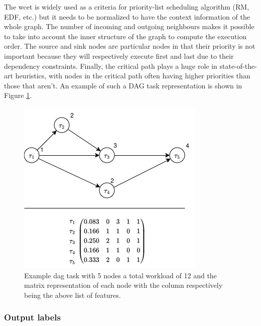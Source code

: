 The wcet is widely used as a criteria for priority-list scheduling algorithm (RM, EDF\cite{buttazzo2005RMvsEDF}, etc.)
but it needs to be normalized to have the context information of the whole graph.
The number of incoming and outgoing neighbours makes it possible 
to take into account the inner structure of the graph to compute the execution order.
The source and sink nodes are particular nodes in that their priority
is not important because they will respectively execute first and last due to their dependency constraints.
Finally, the critical path plays a huge role in state-of-the-art heuristics\cite{He2019DagIntra}\cite{zhao2020DAGsched},
with nodes in the critical path often having higher priorities than those
that aren't.
An example of such a DAG task representation is shown in Figure \ref{fig:dag_task_matrix_example}.

\begin{figure}
    \centering
    \includegraphics[width=\linewidth]{images/dag_matrix_example.drawio.png}
    \caption{Example dag task with 5 nodes a total workload of 12
    and the matrix representation of each node with the column respectively being the above list of features.}
    \label{fig:dag_task_matrix_example}
\end{figure}

\subsubsection{Output labels}
~

